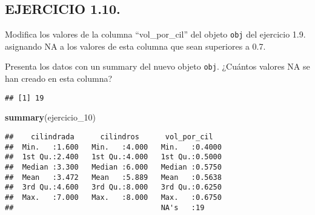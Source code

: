 \documentclass[]{article}
\newenvironment{Shaded}{\begin{snugshade}}{\end{snugshade}}
\newcommand{\CommentTok}[1]{\textcolor[rgb]{0.56,0.35,0.01}{\textit{#1}}}
\newcommand{\DecValTok}[1]{\textcolor[rgb]{0.00,0.00,0.81}{#1}}
\newcommand{\FloatTok}[1]{\textcolor[rgb]{0.00,0.00,0.81}{#1}}
\newcommand{\KeywordTok}[1]{\textcolor[rgb]{0.13,0.29,0.53}{\textbf{#1}}}
\newcommand{\NormalTok}[1]{#1}
\newcommand{\OperatorTok}[1]{\textcolor[rgb]{0.81,0.36,0.00}{\textbf{#1}}}
\newcommand{\OtherTok}[1]{\textcolor[rgb]{0.56,0.35,0.01}{#1}}
\newcommand{\StringTok}[1]{\textcolor[rgb]{0.31,0.60,0.02}{#1}}
\begin{document}
\hypertarget{ejercicio-1.10.}{%
\subsection{EJERCICIO 1.10.}\label{ejercicio-1.10.}}

Modifica los valores de la columna ``vol\_por\_cil'' del objeto
\texttt{obj} del ejercicio 1.9. asignando NA a los valores de esta
columna que sean superiores a 0.7.

Presenta los datos con un summary del nuevo objeto \texttt{obj}.
¿Cuántos valores NA se han creado en esta columna?

\begin{Shaded}
\end{Shaded}

\begin{verbatim}
## [1] 19
\end{verbatim}

\begin{Shaded}
\begin{Highlighting}[]
\KeywordTok{summary}\NormalTok{(ejercicio_}\DecValTok{10}\NormalTok{)}
\end{Highlighting}
\end{Shaded}

\begin{verbatim}
##    cilindrada      cilindros      vol_por_cil    
##  Min.   :1.600   Min.   :4.000   Min.   :0.4000  
##  1st Qu.:2.400   1st Qu.:4.000   1st Qu.:0.5000  
##  Median :3.300   Median :6.000   Median :0.5750  
##  Mean   :3.472   Mean   :5.889   Mean   :0.5638  
##  3rd Qu.:4.600   3rd Qu.:8.000   3rd Qu.:0.6250  
##  Max.   :7.000   Max.   :8.000   Max.   :0.6750  
##                                  NA's   :19
\end{verbatim}
\end{document}

